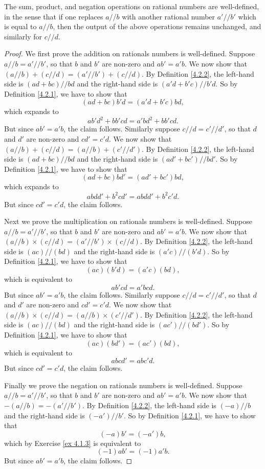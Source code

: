 \begin{lemma}\label{4.2.3}
The sum, product, and negation operations on rational numbers are well-defined, in the sense that if one replaces \(a // b\) with another rational number \(a' // b'\) which is equal to \(a // b\), then the output of the above operations remains unchanged, and similarly for \(c // d\).
\end{lemma}

\begin{proof}
We first prove the addition on rationals numbers is well-defined.
Suppose \(a // b = a' // b'\), so that \(b\) and \(b'\) are non-zero and \(ab' = a'b\).
We now show that \((a // b) + (c // d) = (a' // b') + (c // d)\).
By Definition \ref{4.2.2}, the left-hand side is \((ad + bc) // bd\) and the right-hand side is \((a'd + b'c) // b'd\).
So by Definition \ref{4.2.1}, we have to show that
\[
    (ad + bc)b'd = (a'd + b'c)bd,
\]
which expands to
\[
    ab'd^2 + bb'cd = a'bd^2 + bb'cd.
\]
But since \(ab' = a'b\), the claim follows.
Similarly suppose \(c // d = c' // d'\), so that \(d\) and \(d'\) are non-zero and \(cd' = c'd\).
We now show that \((a // b) + (c // d) = (a // b) + (c' // d')\).
By Definition \ref{4.2.2}, the left-hand side is \((ad + bc) // bd\) and the right-hand side is \((ad' + bc') // bd'\).
So by Definition \ref{4.2.1}, we have to show that
\[
    (ad + bc)bd' = (ad' + bc')bd,
\]
which expands to
\[
    abdd' + b^2cd' = abdd' + b^2c'd.
\]
But since \(cd' = c'd\), the claim follows.

Next we prove the multiplication on rationals numbers is well-defined.
Suppose \(a // b = a' // b'\), so that \(b\) and \(b'\) are non-zero and \(ab' = a'b\).
We now show that \((a // b) \times (c // d) = (a' // b') \times (c // d)\).
By Definition \ref{4.2.2}, the left-hand side is \((ac) // (bd)\) and the right-hand side is \((a'c) // (b'd)\).
So by Definition \ref{4.2.1}, we have to show that
\[
    (ac)(b'd) = (a'c)(bd),
\]
which is equivalent to
\[
    ab'cd = a'bcd.
\]
But since \(ab' = a'b\), the claim follows.
Similarly suppose \(c // d = c' // d'\), so that \(d\) and \(d'\) are non-zero and \(cd' = c'd\).
We now show that \((a // b) \times (c // d) = (a // b) \times (c' // d')\).
By Definition \ref{4.2.2}, the left-hand side is \((ac) // (bd)\) and the right-hand side is \((ac') // (bd')\).
So by Definition \ref{4.2.1}, we have to show that
\[
    (ac)(bd') = (ac')(bd),
\]
which is equivalent to
\[
    abcd' = abc'd.
\]
But since \(cd' = c'd\), the claim follows.

Finally we prove the negation on rationals numbers is well-defined.
Suppose \(a // b = a' // b'\), so that \(b\) and \(b'\) are non-zero and \(ab' = a'b\).
We now show that \(-(a // b) = -(a' // b')\).
By Definition \ref{4.2.2}, the left-hand side is \((-a) // b\) and the right-hand side is \((-a') // b'\).
So by Definition \ref{4.2.1}, we have to show that
\[
    (-a)b' = (-a')b,
\]
which by Exercise \ref{ex 4.1.3} is equivalent to
\[
    (-1)ab' = (-1)a'b.
\]
But since \(ab' = a'b\), the claim follows.
\end{proof}

